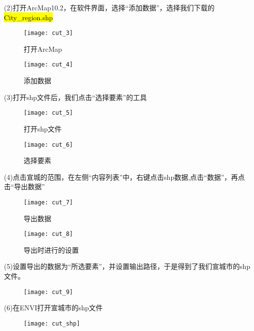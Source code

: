 \documentclass[12pt,a4paper]{article}
\newcommand{\code}[1]{
	\begingroup
	\sethlcolor{Seashell}%
	\textcolor{Firebrick4}{\hl{#1}}%
	\endgroup
}
\begin{document}
(2)打开ArcMap10.2，在软件界面，选择“添加数据”，选择我们下载的\code{City\_region.shp}
\begin{figure}[H]
	\centering
	\begin{minipage}[t]{0.48\textwidth}
		\centering
		\texttt{[image: cut\_3]}
		\caption{打开ArcMap}
	\end{minipage}
	\begin{minipage}[t]{0.48\textwidth}
		\centering 
		\texttt{[image: cut\_4]}
		\caption{添加数据}
	\end{minipage}
\end{figure}
(3)打开shp文件后，我们点击“选择要素”的工具
\begin{figure}[H]
	\centering
	\begin{minipage}[t]{0.48\textwidth}
		\centering
		\texttt{[image: cut\_5]}
		\caption{打开shp文件}
	\end{minipage}
	\begin{minipage}[t]{0.48\textwidth}
		\centering 
		\texttt{[image: cut\_6]}
		\caption{选择要素}
	\end{minipage}
\end{figure}
(4)点击宣城的范围，在左侧“内容列表”中，右键点击shp数据,点击“数据”，再点击“导出数据”
\begin{figure}[H]
	\centering
	\begin{minipage}[t]{0.48\textwidth}
		\centering
		\texttt{[image: cut\_7]}
		\caption{导出数据}
	\end{minipage}
	\begin{minipage}[t]{0.48\textwidth}
		\centering 
		\texttt{[image: cut\_8]}
		\caption{导出时进行的设置}
	\end{minipage}
\end{figure}
(5)设置导出的数据为“所选要素”，并设置输出路径，于是得到了我们宣城市的shp文件。

	\begin{figure}[H]
	\centering
	\texttt{[image: cut\_9]}
\end{figure}

(6)在ENVI打开宣城市的shp文件
	\begin{figure}[H]
	\centering
	\texttt{[image: cut\_shp]}
\end{figure}
\end{document}

